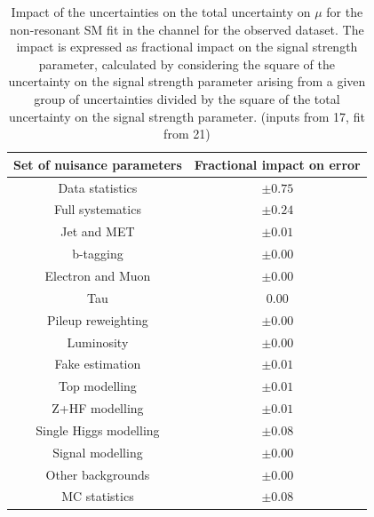 \begin{table}
\centering
\begin{tabular}{|c|c|}
\hline
Set of nuisance parameters & Fractional impact on error\\
\hline
Data statistics & $\pm 0.75$\\
Full systematics & $\pm 0.24$\\
Jet and MET & $\pm 0.01$ \\
b-tagging & $\pm 0.00$\\
Electron and Muon & $\pm 0.00$\\
Tau & $0.00$\\
Pileup reweighting & $\pm 0.00$\\
Luminosity & $\pm 0.00$\\
Fake estimation & $\pm 0.01$\\
Top modelling & $\pm 0.01$\\ 
Z+HF modelling & $\pm 0.01$\\
Single Higgs modelling & $\pm 0.08$\\
Signal modelling & $\pm 0.00$\\
Other backgrounds & $\pm 0.00$\\
MC statistics & $\pm 0.08$\\
\hline
\end{tabular}
\caption{Impact of the uncertainties on the total uncertainty on $\mu$ for the non-resonant SM fit in the \hadhad channel for the observed dataset. The impact is expressed as fractional impact on the signal strength parameter,  calculated by considering the square of the uncertainty on the signal strength parameter arising from a given group of uncertainties divided by the square of the total uncertainty on the signal strength parameter.  (inputs from 17, fit from 21)}
\label{sec:fit:tab:HadHadBreakdownSMObserved}
\end{table}


